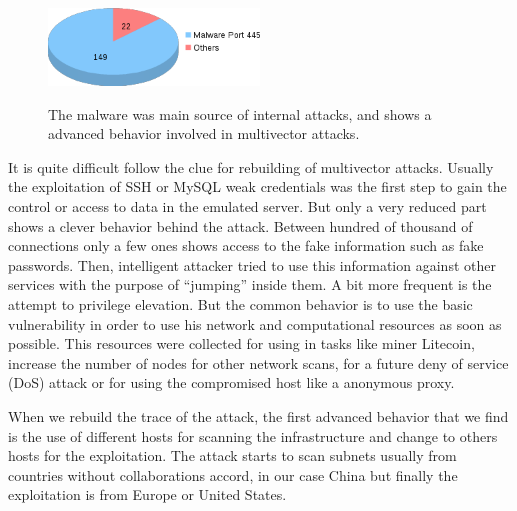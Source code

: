 \documentclass[a4paper]{llncs}
\begin{document}
\begin{figure}[h]
	\includegraphics[width=0.5\textwidth]{internalTypes.png}
	\centering
	\label{fig:internalTypes}
	\caption{The malware was main source of internal attacks, and shows a advanced behavior involved in multivector attacks.}
\end{figure}

It is quite difficult follow the clue for rebuilding of multivector attacks. Usually the exploitation of SSH or MySQL weak credentials was the first step to gain the control or access to data in the emulated server. But only a very reduced part shows a clever behavior behind the attack. Between hundred of thousand of connections only a few ones shows access to the fake information such as fake passwords. Then, intelligent attacker tried to use this information against other services with the purpose of  ``jumping'' inside them. A bit more frequent is the attempt to privilege elevation. But the common behavior is to use the basic vulnerability in order to use his network and computational resources as soon as possible. This resources were collected for using in tasks like miner Litecoin\cite{litecoin}, increase the number of nodes for other network scans, for a future deny of service (DoS) attack or for using the compromised host like a anonymous proxy.

When we rebuild the trace of the attack, the first advanced behavior that we find is the use of different hosts for scanning the infrastructure and change to others hosts for the exploitation. The attack starts to scan subnets usually from countries without collaborations accord, in our case China but finally the exploitation is from Europe or United States.%
	
\end{document}

